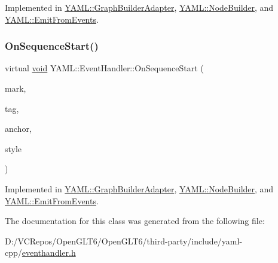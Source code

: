 Implemented in \mbox{\hyperlink{class_y_a_m_l_1_1_graph_builder_adapter_a69cada9fc86a780dc7d78c55a9b064cd}{Y\+A\+M\+L\+::\+Graph\+Builder\+Adapter}}, \mbox{\hyperlink{class_y_a_m_l_1_1_node_builder_ae699f0db4856fd954120ea3dd5d3b839}{Y\+A\+M\+L\+::\+Node\+Builder}}, and \mbox{\hyperlink{class_y_a_m_l_1_1_emit_from_events_ae0d600dcf74515d5cf951c3c68035ff6}{Y\+A\+M\+L\+::\+Emit\+From\+Events}}.

\mbox{\label{class_y_a_m_l_1_1_event_handler_adf7a5e4ccf638b656009525556412ab5}} 
\subsubsection{\texorpdfstring{OnSequenceStart()}{OnSequenceStart()}}
{\footnotesize\ttfamily virtual \mbox{\hyperlink{glad_8h_a950fc91edb4504f62f1c577bf4727c29}{void}} Y\+A\+M\+L\+::\+Event\+Handler\+::\+On\+Sequence\+Start (\begin{DoxyParamCaption}\item[{const \mbox{\hyperlink{struct_y_a_m_l_1_1_mark}{Mark}} \&}]{mark,  }\item[{const \mbox{\hyperlink{glad_8h_ac83513893df92266f79a515488701770}{std\+::string}} \&}]{tag,  }\item[{\mbox{\hyperlink{namespace_y_a_m_l_abeff1798814ae3402fc5665fdcad1de6}{anchor\+\_\+t}}}]{anchor,  }\item[{\mbox{\hyperlink{struct_y_a_m_l_1_1_emitter_style_ae86640662c85ce6062a37f9636b6959f}{Emitter\+Style\+::value}}}]{style }\end{DoxyParamCaption})\hspace{0.3cm}{\ttfamily [pure virtual]}}



Implemented in \mbox{\hyperlink{class_y_a_m_l_1_1_graph_builder_adapter_a97a9fdfd83c8a8a52f848a561116b24f}{Y\+A\+M\+L\+::\+Graph\+Builder\+Adapter}}, \mbox{\hyperlink{class_y_a_m_l_1_1_node_builder_aa69f5009a6cc939b063c1041be30ceb7}{Y\+A\+M\+L\+::\+Node\+Builder}}, and \mbox{\hyperlink{class_y_a_m_l_1_1_emit_from_events_a9c1a257badc0b9631ee52aed5755cd16}{Y\+A\+M\+L\+::\+Emit\+From\+Events}}.



The documentation for this class was generated from the following file\+:\begin{DoxyCompactItemize}
\item 
D\+:/\+V\+C\+Repos/\+Open\+G\+L\+T6/\+Open\+G\+L\+T6/third-\/party/include/yaml-\/cpp/\mbox{\hyperlink{eventhandler_8h}{eventhandler.\+h}}\end{DoxyCompactItemize}

